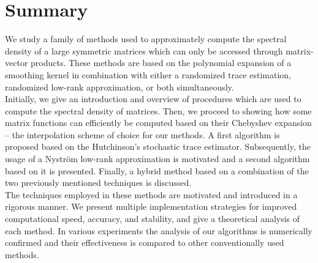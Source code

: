 \chapter*{Summary}
\label{chp:0-summary}

We study a family of methods used to approximately compute the spectral density
of a large symmetric matrices which can only be accessed through matrix-vector
products. These methods are based on the polynomial expansion of a smoothing
kernel in combination with either a randomized trace estimation, randomized
low-rank approximation, or both simultaneously.\\

Initially, we give an introduction and overview of procedures which are used
to compute the spectral density of matrices. Then, we proceed to showing how
some matrix functions can efficiently be computed based on
their Chebyshev expansion -- the interpolation scheme of choice for our
methods. A first algorithm is proposed based on the Hutchinson's stochastic
trace estimator. Subsequently, the usage of a Nystr\"om low-rank approximation is
motivated and a second algorithm based on it is presented. Finally, a hybrid
method based on a combination of the two previously mentioned techniques is
discussed.\\

The techniques employed in these methods are motivated and introduced in a
rigorous manner. We present multiple implementation strategies for improved
computational speed, accuracy, and stability, and give a theoretical analysis
of each method. In various experiments the analysis of our algorithms is
numerically confirmed and their effectiveness is compared to other
conventionally used methods.
